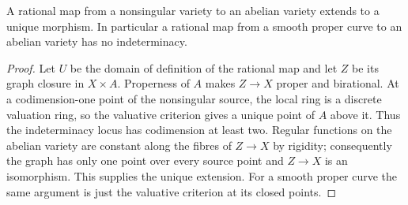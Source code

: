 \begin{theorem}
  \label{mk-thm-rational-extension}
  \cite[Thms.~3.1--3.2]{milne-av}
  A rational map from a nonsingular variety to an abelian variety extends to a
  unique morphism.  In particular a rational map from a smooth proper curve to
  an abelian variety has no indeterminacy.
\end{theorem}

\begin{proof}
  Let \(U\) be the domain of definition of the rational map and let
  \(Z\) be its graph closure in \(X\times A\).  Properness of \(A\) makes
  \(Z\to X\) proper and birational.  At a codimension-one point of the
  nonsingular source, the local ring is a discrete valuation ring, so the
  valuative criterion gives a unique point of \(A\) above it.  Thus the
  indeterminacy locus has codimension at least two.  Regular functions on the
  abelian variety are constant along the fibres of \(Z\to X\) by rigidity;
  consequently the graph has only one point over every source point and
  \(Z\to X\) is an isomorphism.  This supplies the unique extension.  For a
  smooth proper curve the same argument is just the valuative criterion at
  its closed points.
\end{proof}
